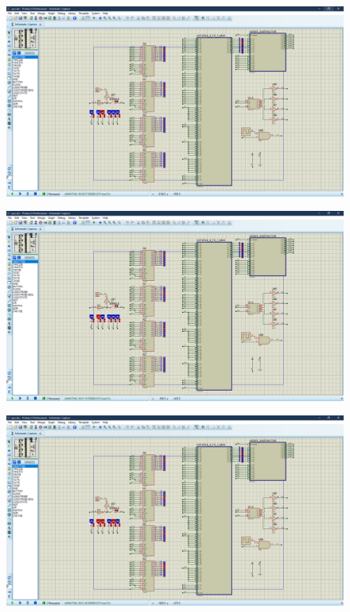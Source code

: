 \documentclass[fleqn]{article}
\begin{document}
\begin{figure}[!htbp]
  \includegraphics[width=\textwidth]{Assets/t4.png}
  \caption{}
  \label{t4}
\end{figure}

\begin{figure}[!htbp]
  \includegraphics[width=\textwidth]{Assets/t5.png}
  \caption{}
  \label{t5}
\end{figure}

\begin{figure}[!htbp]
  \includegraphics[width=\textwidth]{Assets/t6.png}
  \caption{}
  \label{t6}
\end{figure}
\end{document}

